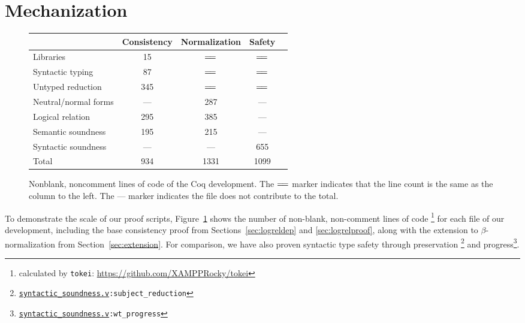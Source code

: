 \documentclass[\ifpublic nolinenum\else\fi,online,OA]{jfp}
\newcommand{\dotv}[2]{\href{#1}{\texttt{#1}}{\texttt{:#2}}}
\theoremstyle{definition}
\begin{document}
\section{Mechanization}
\label{sec:logrelmech}

\begin{figure}[h]
  \centering
  \begin{tabular}{ | l |  c  | c | c | c | }
    \hline
    & Consistency & Normalization & Safety\\
    \hline
    Libraries            &  15 & $=\joinrel=$ & $=\joinrel=$ \\
    Syntactic typing     &  87 & $=\joinrel=$ & $=\joinrel=$ \\
    Untyped reduction    & 345 & $=\joinrel=$ & $=\joinrel=$ \\
    Neutral/normal forms & --- & 287  & ---  \\
    Logical relation     & 295 & 385  & ---  \\
    Semantic soundness   & 195 & 215  & ---  \\
    Syntactic soundness  & --- & ---  & 655  \\
    \hline
    Total                & 934 & 1331 & 1099 \\
    \hline
  \end{tabular}
  \caption{Nonblank, noncomment lines of code of the Coq development.
    The $=\joinrel=$ marker indicates that the line count is the same as the column to the left.
    The --- marker indicates the file does not contribute to the total.}
  \label{fig:linecount}
\end{figure}

To demonstrate the scale of our proof scripts, Figure~\ref{fig:linecount}
shows the number of non-blank, non-comment lines of code%
  \footnote{calculated by \texttt{tokei}:
    \url{https://github.com/XAMPPRocky/tokei} \hfill}
for each file of our development,
including the base consistency proof from Sections~\ref{sec:logreldep} and
\ref{sec:logrelproof}, along with the extension to $\beta$-normalization from
Section~\ref{sec:extension}. For comparison, we have also proven syntactic
type safety through preservation
\footnote{\dotv{syntactic\_soundness.v}{subject\_reduction}} and
progress\footnote{\dotv{syntactic\_soundness.v}{wt\_progress}}.

\end{document}
